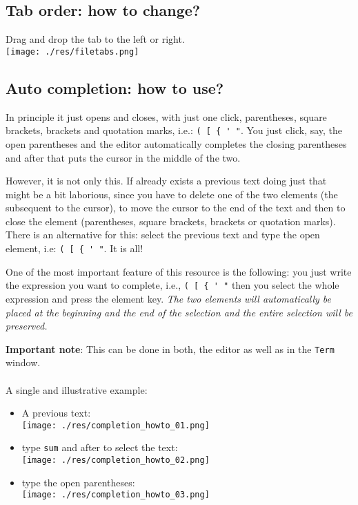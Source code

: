 \subsection{Tab order: how to change?}

Drag and drop the tab to the left or right.\\

\texttt{[image: ./res/filetabs.png]}\\

\subsection{Auto completion: how to use?}

In principle it just opens and closes, with just one click, parentheses, square brackets, brackets and quotation marks, i.e.: \verb|( [ { ' "|.
You just click, say, the open parentheses and the editor automatically completes the closing parentheses and after that puts the cursor in the middle
of the two.

However, it is not only this. If already exists a previous text doing just that might be a bit laborious,
since you have to delete one of the two elements (the subsequent to the cursor), to move the cursor
to the end of the text and then to close the element (parentheses, square brackets, brackets or quotation marks).
There is an alternative for this: select the previous text and type the open element, i.e: \verb|( [ { ' "|. It is all!

One of the most important feature of this resource is the following: you just write the expression you want to complete, i.e., \verb|( [ { ' "|
then you select the whole expression and press the element key.
\textit{The two elements will automatically be placed at the beginning and the end of the selection and the entire selection will be preserved.}

\textbf{Important note}: This can be done in both, the editor as well as in the \texttt{Term} window.
\\
\\
A single and illustrative example:
\begin{itemize}
  \item A previous text: \\
    \texttt{[image: ./res/completion\_howto\_01.png]}
  \item type \texttt{sum} and after to select the text: \\
    \texttt{[image: ./res/completion\_howto\_02.png]}
  \item type the open parentheses: \\
    \texttt{[image: ./res/completion\_howto\_03.png]}
\end{itemize}

